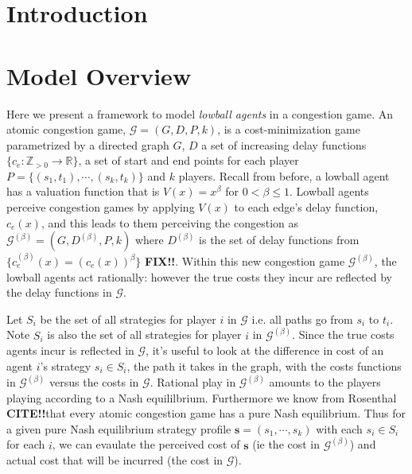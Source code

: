 \documentclass[twoside]{article}
\newcommand{\pbet}{^{(\beta)}}
\newcommand{\fix}{\textbf{FIX!!}}
\newcommand{\cit}{\textbf{CITE!!}}
\begin{document}
\begin{multicols}{2} %

\section{Introduction}



\section{Model Overview}

Here we present a framework to model \textit{lowball agents} in a congestion game.  An atomic congestion game, $\mathcal{G} = (G, D, P, k)$, is a cost-minimization game parametrized by a directed graph $G$, $D$ a set of increasing delay functions $\{c_e : \mathbb{Z}_{>0} \to \mathbb{R}\}$, a set of start and end points for each player $P =\{(s_1, t_1), \cdots, (s_k, t_k)\}$ and $k$ players.  Recall from before, a lowball agent has a valuation function that is $V(x) = x^{\beta}$ for $0 < \beta \le 1$.  
Lowball agents perceive congestion games by applying $V(x)$ to each edge's delay function, $c_e(x)$, and this leads to them perceiving the congestion as $\mathcal{G}\pbet= (G, D\pbet, P, k)$ where $D\pbet$ is the set of delay functions from $\{c_e\pbet(x) = (c_e(x))^\beta\}$ \fix.  Within this new congestion game $\mathcal{G}\pbet$, the lowball agents act rationally: however the true costs they incur are reflected by the delay functions in $\mathcal{G}$.   

Let $S_i$ be the set of all strategies for player $i$ in $\mathcal{G}$ i.e. all paths go from $s_i$ to $t_i$.  Note $S_i$ is also the set of all strategies for player $i$ in $\mathcal{G}\pbet$.  Since the true costs agents incur is reflected in $\mathcal{G}$, it's useful to look at the difference in cost of an agent $i$'s strategy $s_i \in S_i$, the path it takes in the graph, with the costs functions in $\mathcal{G}\pbet$ versus the costs in $\mathcal{G}$.  Rational play in $\mathcal{G}\pbet$ amounts to the players playing according to a Nash equililbrium.  Furthermore we know from Rosenthal \cit that every atomic congestion game has a pure Nash equilibrium.  Thus for a given pure Nash equilibrium strategy profile $\mathbf{s} = (s_1, \cdots, s_k)$ with each $s_i \in S_i$ for each $i$, we can evaulate the perceived cost of $\mathbf{s}$ (ie the cost in $\mathcal{G}\pbet$) and actual cost that will be incurred (the cost in $\mathcal{G}$).


\end{multicols}
\end{document}
